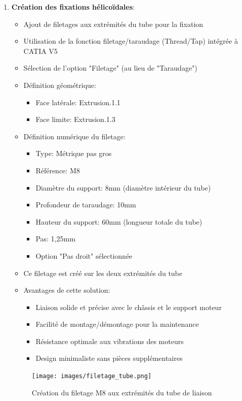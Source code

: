 \documentclass[a4paper,12pt]{report}
\begin{document}
\begin{enumerate}
    \item \textbf{Création des fixations hélicoïdales}:
    \begin{itemize}
        \item Ajout de filetages aux extrémités du tube pour la fixation
        \item Utilisation de la fonction filetage/taraudage (Thread/Tap) intégrée à CATIA V5
        \item Sélection de l'option "Filetage" (au lieu de "Taraudage")
        \item Définition géométrique:
        \begin{itemize}
            \item Face latérale: Extrusion.1\Face.1
            \item Face limite: Extrusion.1\Face.3
        \end{itemize}
        \item Définition numérique du filetage:
        \begin{itemize}
            \item Type: Métrique pas gros
            \item Référence: M8
            \item Diamètre du support: 8mm (diamètre intérieur du tube)
            \item Profondeur de taraudage: 10mm
            \item Hauteur du support: 60mm (longueur totale du tube)
            \item Pas: 1,25mm
            \item Option "Pas droit" sélectionnée
        \end{itemize}
        \item Ce filetage est créé sur les deux extrémités du tube
        \item Avantages de cette solution:
        \begin{itemize}
            \item Liaison solide et précise avec le châssis et le support moteur
            \item Facilité de montage/démontage pour la maintenance
            \item Résistance optimale aux vibrations des moteurs
            \item Design minimaliste sans pièces supplémentaires
        \end{itemize}
    \end{itemize}
    
    \begin{figure}[H]
        \centering
        \texttt{[image: images/filetage\_tube.png]}
        \caption{Création du filetage M8 aux extrémités du tube de liaison}
        \label{fig:filetage_tube}
    \end{figure}
    

\end{enumerate}
\end{document}
